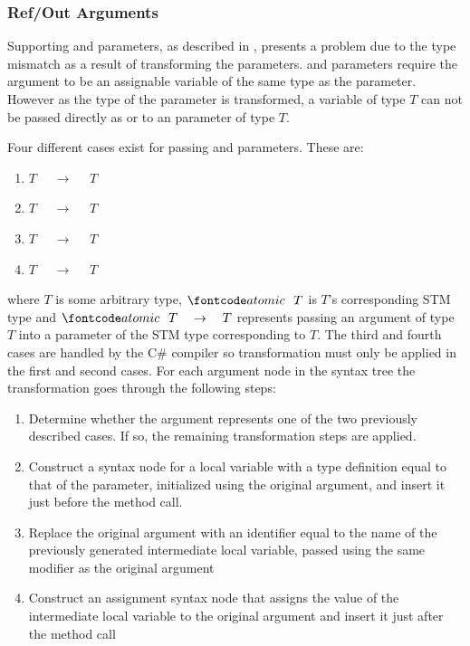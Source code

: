 \subsubsection{Ref/Out Arguments}
Supporting   and  parameters, as described in , presents a problem due to the type mismatch as a result of transforming the parameters.  and  parameters require the argument to be an assignable variable of the same type as the parameter. However as the type of the parameter is transformed, a variable of type $T$ can not be passed directly as  or  to an  parameter of type $T$.

Four different cases exist for passing  and  parameters. These are:
\begin{enumerate}
	\item $T$ $\quad \rightarrow \quad$  $T$
	\item {} $T$ $\quad \rightarrow\quad$ $T$
	\item {} $T$ $\quad \rightarrow\quad$  $T$
	\item $T$ $\quad \rightarrow \quad$ $T$
\end{enumerate} 
where $T$ is some arbitrary type, $\text{ } \bscode{atomic} \quad  T$ is $T$'s corresponding \ac{STM} type and $\text{ } \bscode{atomic} \quad T \quad \rightarrow \quad T$ represents passing an argument of type $T$ into a parameter of the \ac{STM} type corresponding to $T$. The third and fourth cases are handled by the C\# compiler so transformation must only be applied in the first and second cases.
For each argument node in the syntax tree the transformation goes through the following steps:
\begin{enumerate}
	\item Determine whether the argument represents one of the two previously described cases. If so, the remaining transformation steps are applied.
	\item Construct a syntax node for a local variable with a type definition equal to that of the parameter, initialized using the original argument, and insert it just before the method call.
	\item Replace the original argument with an identifier equal to the name of the previously generated intermediate local variable, passed using the same modifier as the original argument
	\item Construct an assignment syntax node that assigns the value of the intermediate local variable to the original argument and insert it just after the method call
\end{enumerate}

